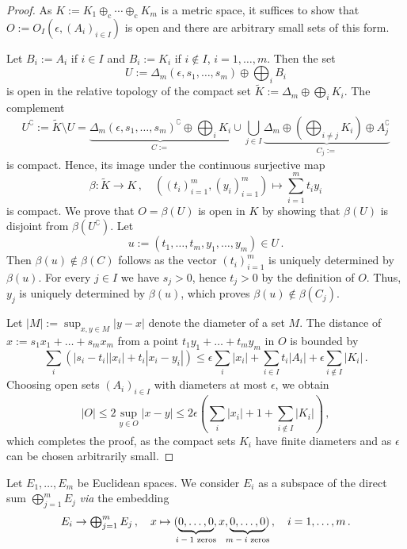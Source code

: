 \documentclass[a4paper,11pt,reqno]{amsart}
\newcommand{\dcs}{\oplus_\mathrm{c}}
\theoremstyle{definition}
\theoremstyle{remark}
\numberwithin{equation}{section}
\begin{document}
\begin{proof}
As $K:=K_1\dcs\cdots\dcs K_m$ is a metric space, it suffices to show that 
$O:=O_I(\epsilon,(A_i)_{i\in I})$ is open and there are arbitrary small 
sets of this form.
\par
%
Let $B_i:=A_i$ if $i\in I$ and $B_i:=K_i$ if $i\not\in I$, $i=1,\dots,m$. 
Then the set 
\[\textstyle
U:=\Delta_m(\epsilon,s_1,\dots,s_m)
\oplus\bigoplus_iB_i
\]
is open in the relative topology of the compact set 
$\widetilde{K}:=\Delta_m\oplus\bigoplus_iK_i$. The complement 
\[
U^\complement:=\widetilde{K}\setminus U
=\underbrace{\textstyle
\Delta_m(\epsilon,s_1,\dots,s_m)^\complement\oplus\bigoplus_iK_i}_{C:=}
\cup\bigcup_{j\in I}
\underbrace{\textstyle
\Delta_m\oplus(\bigoplus_{i\neq j}K_i)\oplus A_j^\complement}_{C_j:=}
\]
is compact. Hence, its image under the continuous surjective map
\[\textstyle
\beta:\widetilde{K}\to K\,,
\quad
((t_i)_{i=1}^m,(y_i)_{i=1}^m)\mapsto\sum_{i=1}^m t_iy_i
\]
is compact. We prove that $O=\beta(U)$ is open in $K$ by showing that 
$\beta(U)$ is disjoint from $\beta(U^\complement)$. Let
\[
u:=(t_1,\dots,t_m,y_1,\dots,y_m)\in U\,.
\]
Then $\beta(u)\not\in\beta(C)$ follows as the vector $(t_i)_{i=1}^m$ is 
uniquely determined by $\beta(u)$. For every $j\in I$ we have $s_j>0$, 
hence $t_j>0$ by the definition of $O$. Thus, $y_j$ is uniquely determined 
by $\beta(u)$, which proves $\beta(u)\not\in\beta(C_j)$.
\par
%
Let $|M|:=\sup_{x,y\in M}|y-x|$ denote the diameter of a set $M$. The 
distance of $x:=s_1x_1+\dots+s_mx_m$ from a point $t_1y_1+\dots+t_my_m$ 
in $O$ is bounded by 
%
\[\textstyle
\sum_i \left( |s_i-t_i| |x_i| + t_i |x_i-y_i| \right)
\leq \epsilon\sum_i
|x_i| + \sum_{i\in I}t_i|A_i| + \epsilon\sum_{i\not\in I}|K_i|\,.
\]
%
Choosing open sets $(A_i)_{i\in I}$ with diameters at most $\epsilon$, 
we obtain 
\[\textstyle
|O|\leq 2\sup_{y\in O}|x-y|\leq 2\epsilon\left(
\sum_i|x_i| + 1 + \sum_{i\not\in I}|K_i|
\right)\,,
\]
which completes the proof, as the compact sets $K_i$ have finite 
diameters and as $\epsilon$ can be chosen arbitrarily small.
\end{proof}
%
Let $E_1,\dots,E_m$ be Euclidean spaces. We consider $E_i$ as a 
subspace of the direct sum $\bigoplus_{j=1}^m E_j$ \emph{via} the 
embedding
\[\textstyle
E_i\to\bigoplus_{j=1}^m E_j\,,
\quad 
x\mapsto (\underbrace{0,\dots,0}_{\makebox[0pt]{\scriptsize $i-1$ zeros}},x,
\underbrace{0,\dots,0}_{\makebox[0pt]{\scriptsize $m-i$ zeros}})\,,
\quad
i=1,\dots,m\,. 
\] 
\par
%
\end{document}
